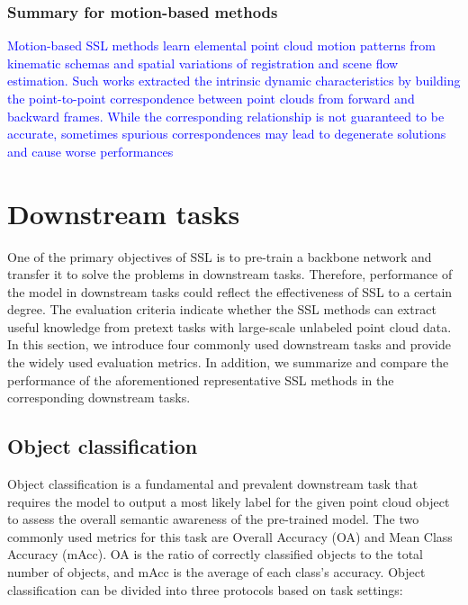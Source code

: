 \documentclass[a4paper,fleqn]{cas-dc}
\begin{document}
\subsubsection{Summary for motion-based methods}
\textcolor{blue}{
Motion-based SSL methods learn elemental point cloud motion patterns from kinematic schemas and spatial variations of registration and scene flow estimation. Such works \citep{wang2019prnet,liu2022self,wu2020pointpwc} extracted the intrinsic dynamic characteristics by building the point-to-point correspondence between point clouds from forward and backward frames. While the corresponding relationship is not guaranteed to be accurate, sometimes spurious correspondences may lead to degenerate solutions and cause worse performances
    }




\section{Downstream tasks}\label{sec:downstream}
One of the primary objectives of SSL is to pre-train a backbone network and transfer it to solve the problems in downstream tasks. Therefore, performance of the model in downstream tasks could reflect the effectiveness of SSL to a certain degree. The evaluation criteria indicate whether the SSL methods can extract useful knowledge from pretext tasks with large-scale unlabeled point cloud data. In this section, we introduce four commonly used downstream tasks and provide the widely used evaluation metrics. In addition, we summarize and compare the performance of the aforementioned representative SSL methods in the corresponding downstream tasks.


\subsection{Object classification}
Object classification is a fundamental and prevalent downstream task that requires the model to output a most likely label for the given point cloud object to assess the overall semantic awareness of the pre-trained model. The two commonly used metrics for this task are Overall Accuracy (OA) and Mean Class Accuracy (mAcc). OA is the ratio of correctly classified objects to the total number of objects, and mAcc is the average of each class's accuracy. Object classification can be divided into three protocols based on task settings:
\end{document}
